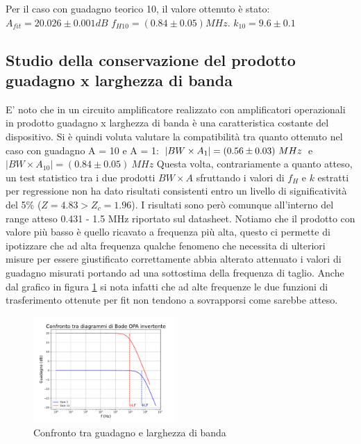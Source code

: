 \documentclass[journal]{IEEEtran}
\begin{document}

Per il caso con guadagno teorico 10, il valore ottenuto è stato:
$A_{fit} = 20.026 \pm 0.001 dB$
$f_{H10} = (0.84 \pm 0.05) MHz$.
$k_{10} = 9.6 \pm 0.1$

\subsection{\textbf{Studio della conservazione del prodotto guadagno x larghezza di banda}}

E' noto che in un circuito amplificatore realizzato con amplificatori operazionali in prodotto guadagno x larghezza di banda è una caratteristica costante del dispositivo. Si è quindi voluta valutare la compatibilità tra quanto ottenuto nel caso con guadagno A = 10 e A = 1: $\\ | BW \times A_1 | = (0.56 \pm 0.03)\ MHz \\$  e  $ | BW \times A_{10} | = (0.84 \pm 0.05)\ MHz$
Questa volta, contrariamente a quanto atteso, un test statistico tra i due prodotti $BW \times A$ sfruttando i valori di $f_H$ e $k$ estratti per regressione non ha dato risultati consistenti entro un livello di significatività del 5\% ($Z = 4.83 > Z_c = 1.96$). I risultati sono però comunque all'interno del range atteso 0.431 - 1.5 MHz riportato sul datasheet. Notiamo che il prodotto con valore più basso è quello ricavato a frequenza più alta, questo ci permette di ipotizzare che ad alta frequenza qualche fenomeno che necessita di ulteriori misure per essere giustificato correttamente abbia alterato attenuato i valori di guadagno misurati portando ad una sottostima della frequenza di taglio.
Anche dal grafico in figura \ref{fig:OPA-bode_gain_comparison(mag)} si nota infatti che ad alte frequenze le due funzioni di trasferimento ottenute per fit non tendono a sovrapporsi come sarebbe atteso.


\begin{figure}[H]%
\begin {center}
\includegraphics[width=0.48\textwidth]{analysis/output/OPA-bode_gain_comparison(mag).pdf}
\caption{Confronto tra guadagno e larghezza di banda}
\label{fig:OPA-bode_gain_comparison(mag)}
\end {center}
\end{figure}
\end{document}
